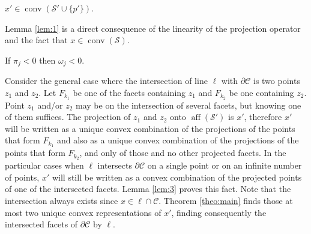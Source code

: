 \begin{lemma}\label{lem:1}
 $x'\in{\operatorname{conv}}({\mathcal{S}}'\cup\{p'\})$.
\end{lemma}

\noindent Lemma \ref{lem:1} is a direct consequence of the linearity of the projection operator and the fact that $x\in{\operatorname{conv}}({\mathcal{S}})$. 

\begin{lemma}\label{lem:2}
	If $\pi_j<0$ then $\omega_j<0$.
\end{lemma}

\medskip

Consider the general case where the intersection of line $\ell$ with $\partial {\mathcal{C}}$ is two points $z_1$ and $z_2$. Let $F_{k_1}$ be one of the facets containing $z_1$ and $F_{k_2}$ be one containing $z_2$. Point $z_1$ and/or $z_2$ may be on the intersection of several facets, but knowing one of them suffices. The projection of $z_1$ and $z_2$ onto ${\operatorname{aff}}({\mathcal{S}}')$ is $x'$, therefore $x'$ will be written as a unique convex combination of the projections of the points that form $F_{k_1}$ and also as a unique convex combination of the projections of the points that form $F_{k_2}$, and only of those and no other projected facets. In the particular cases when $\ell$ intersects $\partial{\mathcal{C}}$ on a single point or on an infinite number of points, $x'$ will still be written as a convex combination of the projected points of one of the intersected facets. Lemma \ref{lem:3} proves this fact. Note that the intersection always exists since $x\in\ell\cap{\mathcal{C}}$. Theorem \ref{theo:main} finds those at most two unique convex representations of $x'$, finding consequently the intersected facets of $\partial {\mathcal{C}}$ by $\ell$. 

